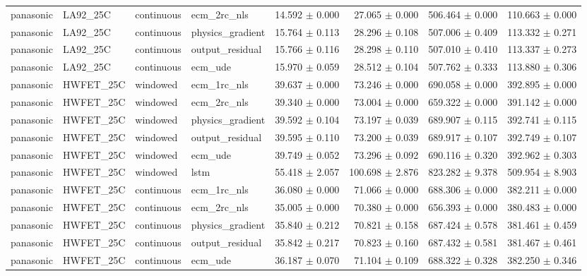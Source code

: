 \begin{longtable}{llllrrrr}
panasonic & LA92\_25C & continuous & ecm\_2rc\_nls & 14.592 $\pm$ 0.000 & 27.065 $\pm$ 0.000 & 506.464 $\pm$ 0.000 & 110.663 $\pm$ 0.000 \\
panasonic & LA92\_25C & continuous & physics\_gradient & 15.764 $\pm$ 0.113 & 28.296 $\pm$ 0.108 & 507.006 $\pm$ 0.409 & 113.332 $\pm$ 0.271 \\
panasonic & LA92\_25C & continuous & output\_residual & 15.766 $\pm$ 0.116 & 28.298 $\pm$ 0.110 & 507.010 $\pm$ 0.410 & 113.337 $\pm$ 0.273 \\
panasonic & LA92\_25C & continuous & ecm\_ude & 15.970 $\pm$ 0.059 & 28.512 $\pm$ 0.104 & 507.762 $\pm$ 0.333 & 113.880 $\pm$ 0.306 \\
panasonic & HWFET\_25C & windowed & ecm\_1rc\_nls & 39.637 $\pm$ 0.000 & 73.246 $\pm$ 0.000 & 690.058 $\pm$ 0.000 & 392.895 $\pm$ 0.000 \\
panasonic & HWFET\_25C & windowed & ecm\_2rc\_nls & 39.340 $\pm$ 0.000 & 73.004 $\pm$ 0.000 & 659.322 $\pm$ 0.000 & 391.142 $\pm$ 0.000 \\
panasonic & HWFET\_25C & windowed & physics\_gradient & 39.592 $\pm$ 0.104 & 73.197 $\pm$ 0.039 & 689.907 $\pm$ 0.115 & 392.741 $\pm$ 0.115 \\
panasonic & HWFET\_25C & windowed & output\_residual & 39.595 $\pm$ 0.110 & 73.200 $\pm$ 0.039 & 689.917 $\pm$ 0.107 & 392.749 $\pm$ 0.107 \\
panasonic & HWFET\_25C & windowed & ecm\_ude & 39.749 $\pm$ 0.052 & 73.296 $\pm$ 0.092 & 690.116 $\pm$ 0.320 & 392.962 $\pm$ 0.303 \\
panasonic & HWFET\_25C & windowed & lstm & 55.418 $\pm$ 2.057 & 100.698 $\pm$ 2.876 & 823.282 $\pm$ 9.378 & 509.954 $\pm$ 8.903 \\
panasonic & HWFET\_25C & continuous & ecm\_1rc\_nls & 36.080 $\pm$ 0.000 & 71.066 $\pm$ 0.000 & 688.306 $\pm$ 0.000 & 382.211 $\pm$ 0.000 \\
panasonic & HWFET\_25C & continuous & ecm\_2rc\_nls & 35.005 $\pm$ 0.000 & 70.380 $\pm$ 0.000 & 656.393 $\pm$ 0.000 & 380.483 $\pm$ 0.000 \\
panasonic & HWFET\_25C & continuous & physics\_gradient & 35.840 $\pm$ 0.212 & 70.821 $\pm$ 0.158 & 687.424 $\pm$ 0.578 & 381.461 $\pm$ 0.459 \\
panasonic & HWFET\_25C & continuous & output\_residual & 35.842 $\pm$ 0.217 & 70.823 $\pm$ 0.160 & 687.432 $\pm$ 0.581 & 381.467 $\pm$ 0.461 \\
panasonic & HWFET\_25C & continuous & ecm\_ude & 36.187 $\pm$ 0.070 & 71.104 $\pm$ 0.109 & 688.322 $\pm$ 0.328 & 382.250 $\pm$ 0.346 \\

\end{longtable}
